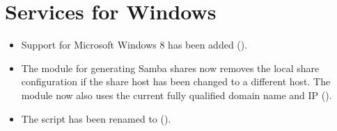 \section{Services for Windows}

\begin{itemize}
\item Support for Microsoft Windows 8 has been added ().
\item The \ucsUDL{} module for generating Samba shares now removes the
  local share configuration if the share host has been changed to a
  different host. The module now also uses the current fully qualified
  domain name and IP ().
\item The script  has been renamed to
   ().
\end{itemize}

